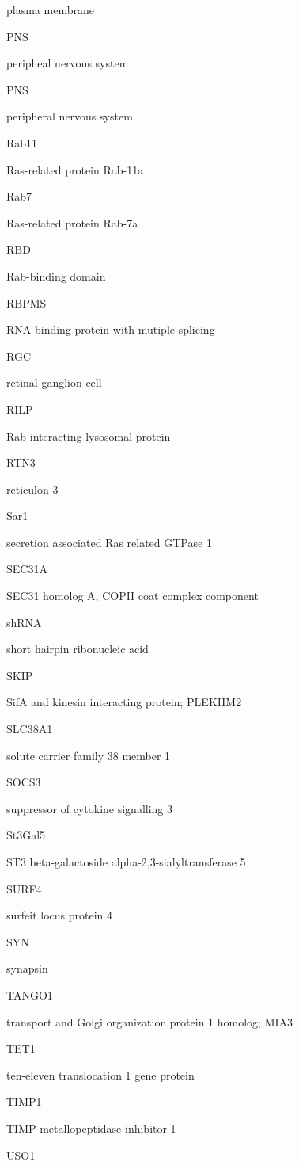 \documentclass[
  12pt,
  a4paper,
]{book}
\begin{document}
plasma membrane

PNS

peripheal nervous system

PNS

peripheral nervous system

Rab11

Ras-related protein Rab-11a

Rab7

Ras-related protein Rab-7a

RBD

Rab-binding domain

RBPMS

RNA binding protein with mutiple splicing

RGC

retinal ganglion cell

RILP

Rab interacting lysosomal protein

RTN3

reticulon 3

Sar1

secretion associated Ras related GTPase 1

SEC31A

SEC31 homolog A, COPII coat complex component

shRNA

short hairpin ribonucleic acid

SKIP

SifA and kinesin interacting protein; PLEKHM2

SLC38A1

solute carrier family 38 member 1

SOCS3

suppressor of cytokine signalling 3

St3Gal5

ST3 beta-galactoside alpha-2,3-sialyltransferase 5

SURF4

surfeit locus protein 4

SYN

synapsin

TANGO1

transport and Golgi organization protein 1 homolog; MIA3

TET1

ten-eleven translocation 1 gene protein

TIMP1

TIMP metallopeptidase inhibitor 1

USO1
\end{document}
